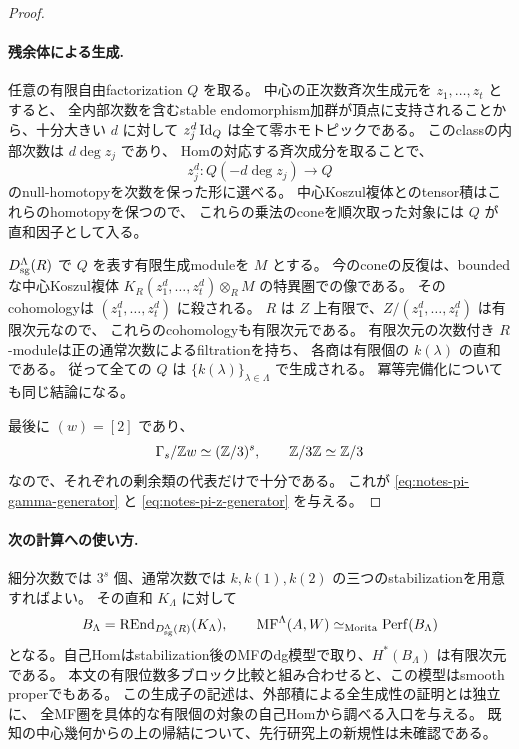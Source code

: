 \begin{proof}
\paragraph{残余体による生成.}
任意の有限自由factorization \(Q\) を取る。
中心の正次数斉次生成元を \(z_1,\ldots,z_t\) とすると、
全内部次数を含むstable endomorphism加群が頂点に支持されることから、十分大きい \(d\) に対して
\(z_j^d\operatorname{Id}_Q\) は全て零ホモトピックである。
このclassの内部次数は \(d\deg z_j\) であり、
Homの対応する斉次成分を取ることで、
\[
 z_j^d:Q(-d\deg z_j)\longrightarrow Q
\]
のnull-homotopyを次数を保った形に選べる。
中心Koszul複体とのtensor積はこれらのhomotopyを保つので、
これらの乗法のconeを順次取った対象には \(Q\) が直和因子として入る。

\(D_{\mathrm{sg}}^\Lambda(R)\) で \(Q\) を表す有限生成moduleを \(M\) とする。
今のconeの反復は、boundedな中心Koszul複体
\(K_R(z_1^d,\ldots,z_t^d)\otimes_R M\) の特異圏での像である。
そのcohomologyは \((z_1^d,\ldots,z_t^d)\) に殺される。
\(R\) は \(Z\) 上有限で、\(Z/(z_1^d,\ldots,z_t^d)\) は有限次元なので、
これらのcohomologyも有限次元である。
有限次元の次数付き \(R\)-moduleは正の通常次数によるfiltrationを持ち、
各商は有限個の \(k(\lambda)\) の直和である。
従って全ての \(Q\) は \(\{k(\lambda)\}_{\lambda\in\Lambda}\) で生成される。
冪等完備化についても同じ結論になる。

最後に \((w)=[2]\) であり、
\[
 \Gamma_s/\mathbb Z w\simeq(\mathbb Z/3)^s,\qquad \mathbb Z/3\mathbb Z\simeq\mathbb Z/3
\]
なので、それぞれの剰余類の代表だけで十分である。
これが \eqref{eq:notes-pi-gamma-generator} と \eqref{eq:notes-pi-z-generator} を与える。
\end{proof}

\paragraph{次の計算への使い方.}
細分次数では \(3^s\) 個、通常次数では \(k,k(1),k(2)\) の三つのstabilizationを用意すればよい。
その直和 \(K_\Lambda\) に対して
\[
 B_\Lambda=\operatorname{REnd}_{D_{\mathrm{sg}}^\Lambda(R)}(K_\Lambda),\qquad
 \operatorname{MF}^\Lambda(A,W)\simeq_{\mathrm{Morita}}\operatorname{Perf}(B_\Lambda)
\]
となる。自己Homはstabilization後のMFのdg模型で取り、\(H^*(B_\Lambda)\) は有限次元である。
本文の有限位数多ブロック比較と組み合わせると、この模型はsmooth properでもある。
この生成子の記述は、外部積による全生成性の証明とは独立に、
全MF圏を具体的な有限個の対象の自己Homから調べる入口を与える。
既知の中心幾何からの上の帰結について、先行研究上の新規性は未確認である。

